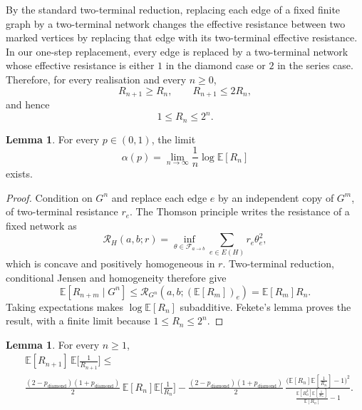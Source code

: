 \documentclass{article}
\theoremstyle{plain}
\theoremstyle{definition}
\newtheorem{lemma}[theorem]{Lemma}
\newcommand{\Reff}{\mathscr{R}}
\begin{document}
By the standard two-terminal reduction, replacing each edge of a fixed finite graph by a two-terminal network changes the effective resistance between two marked vertices by replacing that edge with its two-terminal effective resistance.
In our one-step replacement, every edge is replaced by a two-terminal network whose effective resistance is either $1$ in the diamond case or $2$ in the series case.
Therefore, for every realisation and every $n\ge 0$,
\[
R_{n+1}\ge R_n,
\qquad
R_{n+1}\le 2R_n,
\]
and hence
\[
1\le R_n\le 2^n.
\]






\begin{lemma}\label{lem:annealed_exponent}
For every $p\in(0,1)$, the limit
\[
\alpha(p)=\lim_{n\to\infty}\frac{1}{n}\log \mathbb E[R_n]
\]
exists.
\end{lemma}

\begingroup\color{red}
\begin{proof}
Condition on $G^n$ and replace each edge $e$ by an independent copy of
$G^m$, of two-terminal resistance $r_e$. The Thomson principle writes
the resistance of a fixed network as
\[
\Reff_H(a,b;r)=\inf_{\theta\in\mathcal F_{a\to b}}
\sum_{e\in E(H)}r_e\theta_e^2,
\]
which is concave and positively homogeneous in $r$.
Two-terminal reduction, conditional Jensen and homogeneity therefore give
\[
\mathbb E[R_{n+m}\mid G^n]
\le \Reff_{G^n}(a,b;(\mathbb E[R_m])_e)
=\mathbb E[R_m]R_n.
\]
Taking expectations makes $\log\mathbb E[R_n]$ subadditive.
Fekete's lemma proves the result, with a finite limit because
$1\le R_n\le2^n$.
\end{proof}
\endgroup{}


\begin{lemma}\label{lem:logistic_product}
For every $n\ge 1$,
\begin{align*}
&\mathbb E[R_{n+1}]\,\mathbb E\Big[\frac{1}{R_{n+1}}\Big]
\le \\
&\frac{(2-p_{\mathrm{diamond}})(1+p_{\mathrm{diamond}})}{2}\,
\mathbb E[R_n]\mathbb E\Big[\frac{1}{R_n}\Big]
-
\frac{(2-p_{\mathrm{diamond}})(1+p_{\mathrm{diamond}})}{2}\,
\frac{\big(\mathbb E[R_n]\mathbb E[\frac{1}{R_n}]-1\big)^2}
{\frac{\mathbb E[R_n^2]\mathbb E[\frac{1}{R_n}]}{\mathbb E[R_n]}-1}.
\end{align*}
\end{lemma}
\end{document}
